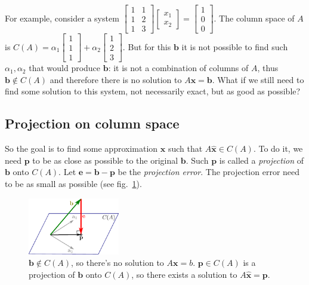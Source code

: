 \documentclass{acm_proc_article-sp}
\begin{document}
For example, consider a system \(\begin{bmatrix} 1 & 1 \\ 1 & 2 \\ 1 & 3 \end{bmatrix} \begin{bmatrix} x_1 \\ x_2 \end{bmatrix} = \begin{bmatrix} 1 \\ 0 \\ 0 \end{bmatrix}\). The column space of \(A\) is
\(C(A) = \alpha_1 \begin{bmatrix} 1 \\ 1 \\ 1 \end{bmatrix} + \alpha_2 \begin{bmatrix} 1 \\ 2 \\ 3 \end{bmatrix}\). But for this $\mathbf b$ it is not possible to find such $\alpha_1, \alpha_2$ that would produce $\mathbf b$: it is not a combination of columns of \(A\), thus
\(\mathbf b \not \in C(A)\) and therefore there is no solution to \(A \mathbf x = \mathbf b\). What if we still need to find some solution to this system, not necessarily exact, but as good as possible?


\subsection{Projection on column space}

So the goal is to find some approximation \(\hat {\mathbf x}\) such that \(A \hat {\mathbf x} \in C(A)\). To do it, we need $\mathbf p$ to be as close as possible to the original \(\mathbf b\).
Such $\mathbf p$ is called a \emph{projection} of $\mathbf b$ onto $C(A)$.
Let \(\mathbf e = \mathbf b - \mathbf p\) be the \emph{projection error}.
The projection error need to be as small as possible (see fig.~\ref{fig:least-squares-proj}).


\begin{figure}
\centering
\includegraphics[width=4cm]{least-squares-proj.pdf}
\caption{$\mathbf b \not \in C(A)$, so there's no solution to $A \mathbf x = b$. $\mathbf p \in C(A)$ is a projection of $\mathbf b$ onto $C(A)$, so there exists a solution to $A \hat {\mathbf x} = \mathbf p$.}
\label{fig:least-squares-proj}
\end{figure}
\end{document}
